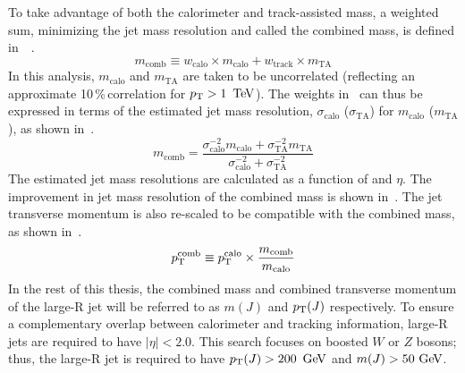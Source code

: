To take advantage of both the calorimeter and track-assisted mass, a weighted sum, minimizing the jet mass resolution and called the combined mass, is defined in~\Eqn{\ref{eq:m_comb}}~\cite{jet_comb_mass}.
\begin{equation}
m_{\textrm{comb}} \equiv w_{\textrm{calo}}\times m_{\textrm{calo}} + w_{\textrm{track}}\times m_{\textrm{TA}}
\label{eq:m_comb}
\end{equation}
In this analysis, $m_{\textrm{calo}}$ and $m_{\textrm{TA}}$ are taken to be uncorrelated (reflecting an approximate 10\,\%\,correlation for $\pT > 1\,\TeV$). The weights in~\Eqn{\ref{eq:m_comb}} can thus be expressed in terms of the estimated jet mass resolution, $\sigma_{\textrm{calo}}$ ($\sigma_{\textrm{TA}}$) for $m_{\textrm{calo}}$ ($m_{\textrm{TA}}$), as shown in~\Eqn{\ref{eq:m_comb_uncorr}}.
\begin{equation}
m_{\textrm{comb}} = \frac{\sigma_{\textrm{calo}}^{-2}m_{\textrm{calo}} +  \sigma_{\textrm{TA}}^{-2}m_{\textrm{TA}}}{\sigma_{\textrm{calo}}^{-2}+\sigma_{\textrm{TA}}^{-2}}
\label{eq:m_comb_uncorr}
\end{equation}
The estimated jet mass resolutions are calculated as a function of \pT and $\eta$. The improvement in jet mass resolution of the combined mass is shown in~\Fig{\ref{fig:m_comb_res}}. The jet transverse momentum is also re-scaled to be compatible with the combined mass, as shown in~\Eqn{\ref{eq:jet_pt_comb}}.
\begin{equation}
p_{\rm T}^{\textrm{comb}} \equiv p_{\rm T}^{\textrm{calo}}\times\frac{m_{\textrm{comb}}}{m_{\textrm{calo}}}
\label{eq:jet_pt_comb}
\end{equation}
In the rest of this thesis, the combined mass and combined transverse momentum of the large-R jet will be referred to as $m(J)$ and $p_{\text{T}}(J)$ respectively. To ensure a complementary overlap between calorimeter and tracking information, large-R jets are required to have $|\eta|<2.0$. This search focuses on boosted $W$ or $Z$ bosons; thus, the large-R jet is required to have $\pT(J)>200\,\GeV$ and $m(J)>50\GeV$.
